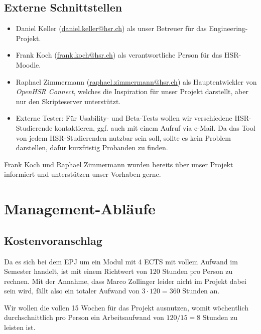 \documentclass[a4paper]{article}
\let\oldsection\section
\renewcommand\section{\clearpage\oldsection}
\begin{document}
\subsection{Externe Schnittstellen}


\begin{itemize}
  \item Daniel Keller (\url{daniel.keller@hsr.ch}) als unser Betreuer für das Engineering-Projekt.
  \item Frank Koch (\url{frank.koch@hsr.ch}) als verantwortliche Person für das HSR-Moodle.
  \item Raphael Zimmermann (\url{raphael.zimmermann@hsr.ch}) als Hauptentwickler
    von \emph{OpenHSR Connect}, welches die
    Inspiration für unser Projekt darstellt, aber nur den Skripteserver
    unterstützt.
  \item Externe Tester: Für Usability- und Beta-Tests wollen wir verschiedene
    HSR-Studierende kontaktieren, ggf. auch mit einem Aufruf via e-Mail. Da das
    Tool von jedem HSR-Studierenden nutzbar sein soll, sollte es kein Problem
    darstellen, dafür kurzfristig Probanden zu finden.
\end{itemize}

Frank Koch und Raphael Zimmermann wurden bereits über unser Projekt informiert
und unterstützen unser Vorhaben gerne.

\section{Management-Abläufe}
\subsection{Kostenvoranschlag}

Da es sich bei dem EPJ um ein Modul mit 4 ECTS mit vollem Aufwand im Semester handelt, ist mit einem Richtwert von 120 Stunden pro Person zu rechnen.
Mit der Annahme, dass Marco Zollinger leider nicht im Projekt dabei sein wird,
fällt also ein totaler Aufwand von $3 \cdot 120 = 360$ Stunden an.

Wir wollen die vollen 15 Wochen für das Projekt ausnutzen, womit wöchentlich
durchschnittlich pro Person ein Arbeitsaufwand von $120 / 15 = 8$ Stunden zu
leisten ist.
\end{document}
